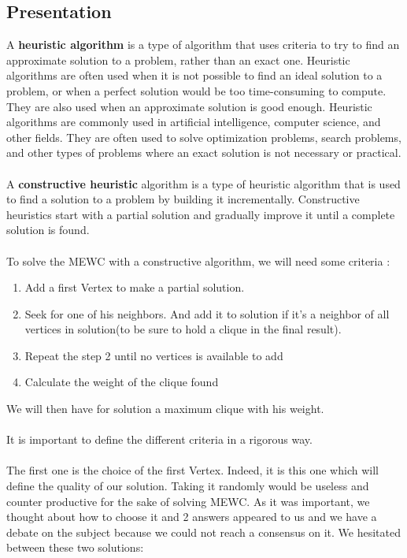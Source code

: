 
\subsection{Presentation}

    A \textbf{heuristic algorithm} is a type of algorithm that uses criteria to try to find an approximate solution to a problem, rather than an exact one. Heuristic algorithms are often used when it is not possible to find an ideal solution to a problem, or when a perfect solution would be too time-consuming to compute. They are also used when an approximate solution is good enough. Heuristic algorithms are commonly used in artificial intelligence, computer science, and other fields. They are often used to solve optimization problems, search problems, and other types of problems where an exact solution is not necessary or practical.
    \\ \\
    A \textbf{constructive heuristic} algorithm is a type of heuristic algorithm that is used to find a solution to a problem by building it incrementally. Constructive heuristics start with a partial solution and gradually improve it until a complete solution is found.
    \\ \\
    To solve the MEWC with a constructive algorithm, we will need some criteria : 

    \begin{enumerate}
        \item Add a first Vertex to make a partial solution.
        \item Seek for one of his neighbors. And add it to solution if it's a neighbor of all vertices in solution(to be sure to hold a clique in the final result).
        \item Repeat the step 2 until no vertices is available to add
        \item Calculate the weight of the clique found
    \end{enumerate}

    We will then have for solution a maximum clique with his weight. 
    \\ \\
    It is important to define the different criteria in a rigorous way. 
    \\ \\
    The first one is the choice of the first Vertex. Indeed, it is this one which will define the quality of our solution. Taking it randomly would be useless and counter productive for the sake of solving MEWC. As it was important, we thought about how to choose it and 2 answers appeared to us and we have a debate on the subject because we could not reach a consensus on it. We hesitated between these two solutions:

